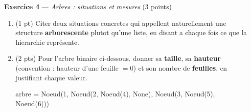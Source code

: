 \bigskip

\textbf{Exercice 4} --- \textit{Arbres : situations et mesures} \hfill (3 points)

\begin{enumerate}
  \item (1 pt) Citer deux situations concretes qui appellent naturellement une structure
  \textbf{arborescente} plutot qu'une liste, en disant a chaque fois ce que la hierarchie
  représente.
  \item (2 pts) Pour l'arbre binaire ci-dessous, donner sa \textbf{taille}, sa
  \textbf{hauteur} (convention : hauteur d'une feuille $=0$) et son nombre de
  \textbf{feuilles}, en justifiant chaque valeur.
\begin{python}
arbre = Noeud(1, Noeud(2, Noeud(4), None), Noeud(3, Noeud(5), Noeud(6)))
\end{python}
\end{enumerate}

%
%
%
%
